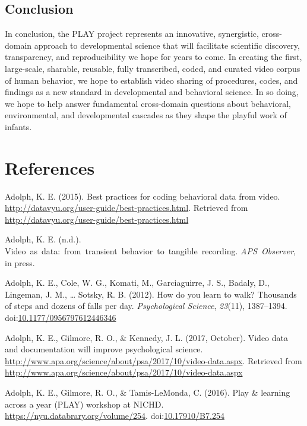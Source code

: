 \documentclass[english,man]{apa6}
\theoremstyle{definition}
\theoremstyle{definition}
\theoremstyle{definition}
\theoremstyle{remark}
\begin{document}
\subsection{Conclusion}\label{conclusion}

In conclusion, the PLAY project represents an innovative, synergistic,
cross-domain approach to developmental science that will facilitate
scientific discovery, transparency, and reproducibility we hope for
years to come. In creating the first, large-scale, sharable, reusable,
fully transcribed, coded, and curated video corpus of human behavior, we
hope to establish video sharing of procedures, codes, and findings as a
new standard in developmental and behavioral science. In so doing, we
hope to help answer fundamental cross-domain questions about behavioral,
environmental, and developmental cascades as they shape the playful work
of infants.

\newpage

\section{References}\label{references}

\setlength{\parindent}{-0.5in} \setlength{\leftskip}{0.5in}

\hypertarget{refs}{}
\hypertarget{ref-Adolph2015-oy}{}
Adolph, K. E. (2015). Best practices for coding behavioral data from
video. \url{http://datavyu.org/user-guide/best-practices.html}.
Retrieved from \url{http://datavyu.org/user-guide/best-practices.html}

\hypertarget{ref-Adolph_undated-od}{}
Adolph, K. E. (n.d.).
Video~as~data:~from~transient~behavior~to~tangible~recording.
\emph{APS~Observer}, in press.

\hypertarget{ref-Adolph2012-ab}{}
Adolph, K. E., Cole, W. G., Komati, M., Garciaguirre, J. S., Badaly, D.,
Lingeman, J. M., \ldots{} Sotsky, R. B. (2012). How do you learn to
walk? Thousands of steps and dozens of falls per day.
\emph{Psychological Science}, \emph{23}(11), 1387--1394.
doi:\href{https://doi.org/10.1177/0956797612446346}{10.1177/0956797612446346}

\hypertarget{ref-Adolph2017-ac}{}
Adolph, K. E., Gilmore, R. O., \& Kennedy, J. L. (2017, October). Video
data and documentation will improve psychological science.
\url{http://www.apa.org/science/about/psa/2017/10/video-data.aspx}.
Retrieved from
\url{http://www.apa.org/science/about/psa/2017/10/video-data.aspx}

\hypertarget{ref-PLAY-workshop-Databrary}{}
Adolph, K. E., Gilmore, R. O., \& Tamis-LeMonda, C. (2016). Play \&
learning across a year (PLAY) workshop at NICHD.
\url{https://nyu.databrary.org/volume/254}.
doi:\href{https://doi.org/10.17910/B7.254}{10.17910/B7.254}
\end{document}
